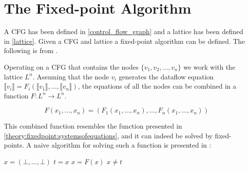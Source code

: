 \section{The Fixed-point Algorithm}
A CFG has been defined in \cref{control_flow_graph} and a lattice has been defined in \cref{lattice}.
Given a CFG and lattice a fixed-point algorithm can be defined.
The following is from \citet{schwartzbach}.


Operating on a CFG that contains the nodes $\{ v_1, v_2, \dots, v_n \}$ we work with the lattice $L^n$.
Assuming that the node $v_i$ generates the dataflow equation $\llbracket v_i \rrbracket = F_i ( \llbracket v_1 \rrbracket, \dots, \llbracket v_n \rrbracket)$, the equations of all the nodes can be combined in a function $ F: L^n \rightarrow L^n$.

\[ F(x_1, \dots, x_n) = (F_1(x_1, \dots, x_n), \dots, F_n(x_1, \dots, x_n)) \]

This combined function resembles the function presented in \cref{theory:fixedpoint:systemsofequations}, and it can indeed be solved by fixed-points.
A naive algorithm for solving such a function is presented in \citet{schwartzbach}:

\begin{algorithmic}
  \State $x = (\bot, \dots, \bot)$
  \Do
  \State $t = x$
  \State $x = F(x)$
  \doWhile $ x \ne t $
\end{algorithmic}

